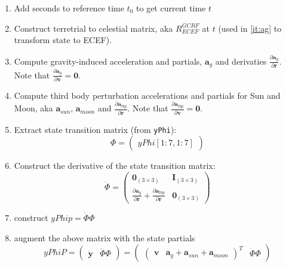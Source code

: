 \begin{enumerate}
    \item Add seconds to reference time $t_0$ to get current time $t$
    
    \item Construct terretrial to celestial matrix, aka $R^{GCRF}_{ECEF}$ at 
        $t$ (used in \ref{it:ag} to transform state to ECEF).
    
    \item \label{it:ag} Compute gravity-induced acceleration and partials, 
        $\bm{a}_g$ and derivaties  
        $\frac{\partial \bm{a}_g}{\partial \bm{r}}$. Note that 
        $\frac{\partial \bm{a}_g}{\partial \bm{v}} = \bm{0}$.
    
    \item \label{it:atbp} Compute third body perturbation accelerations and 
        partials for Sun and Moon, aka $\bm{a}_{sun}$, $\bm{a}_{moon}$ and 
        $\frac{\partial \bm{a}_{tbp}}{\partial \bm{r}}$. Note that 
        $\frac{\partial \bm{a}_{tbp}}{\partial \bm{v}} = \bm{0}$.
    
    \item Extract state transition matrix (from \texttt{yPhi}):
        \begin{equation}
            \Phi = 
            \begin{pmatrix}
                yPhi[1:7, 1:7]
            \end{pmatrix}
        \end{equation}
    
    \item Construct the derivative of the state transition matrix:
        \begin{equation}
            \dot{\Phi} = 
            \begin{pmatrix}
                \bm{0}_{(3 \times 3)} & \bm{I}_{(3 \times 3)} \\
                \frac{\partial \bm{a}_g}{\partial \bm{r}} + 
                    \frac{\partial \bm{a}_{tbp}}{\partial \bm{r}} & \bm{0}_{(3 \times 3)}
            \end{pmatrix}
        \end{equation}
    
    \item construct $yPhip = \dot{\Phi} \Phi$
    
    \item augment the above matrix with the state partials 
        \begin{equation}
            yPhiP = 
            \begin{pmatrix} 
                \dot{\bm{y}} & \dot{\Phi} \Phi 
            \end{pmatrix}  = 
            \begin{pmatrix} 
                \begin{pmatrix} \bm{v} & \bm{a}_g + \bm{a}_{sun} + \bm{a}_{moon} \end{pmatrix}^T 
                & \dot{\Phi} \Phi
            \end{pmatrix}
        \end{equation}
\end{enumerate}

